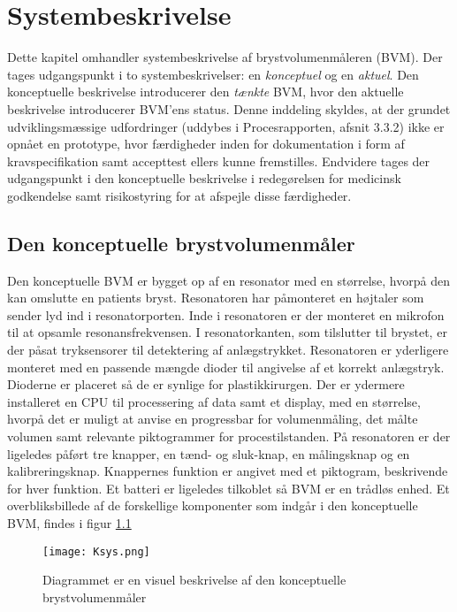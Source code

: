 \chapter{Systembeskrivelse}
Dette kapitel omhandler systembeskrivelse af brystvolumenmåleren (BVM). Der tages udgangspunkt i to systembeskrivelser: en \textit{konceptuel} og en \textit{aktuel}. Den konceptuelle beskrivelse introducerer den \textit{tænkte} BVM, hvor den aktuelle beskrivelse introducerer BVM'ens status. Denne inddeling skyldes, at der grundet udviklingsmæssige udfordringer (uddybes i Procesrapporten, afsnit 3.3.2) ikke er opnået en prototype, hvor færdigheder inden for dokumentation i form af kravspecifikation samt accepttest ellers kunne fremstilles. Endvidere tages der udgangspunkt i den konceptuelle beskrivelse i redegørelsen for medicinsk godkendelse samt risikostyring for at afspejle disse færdigheder.   

\section{Den konceptuelle brystvolumenmåler} \label{sec:BVMopb}
	
	Den konceptuelle BVM er bygget op af en resonator med en størrelse, hvorpå den kan omslutte en patients bryst. Resonatoren har påmonteret en højtaler som sender lyd ind i resonatorporten. Inde i resonatoren er der monteret en mikrofon til at opsamle resonansfrekvensen. I resonatorkanten, som tilslutter til brystet, er der påsat tryksensorer til detektering af anlægstrykket. Resonatoren er yderligere monteret med en passende mængde dioder til angivelse af et korrekt anlægstryk. Dioderne er placeret så de er synlige for plastikkirurgen. Der er ydermere installeret en CPU til processering af data samt et display, med en størrelse, hvorpå det er muligt at anvise en progressbar for volumenmåling, det målte volumen samt relevante piktogrammer for procestilstanden. På resonatoren er der ligeledes påført tre knapper, en tænd- og sluk-knap, en målingsknap og en kalibreringsknap. Knappernes funktion er angivet med et piktogram, beskrivende for hver funktion. Et batteri er ligeledes tilkoblet så BVM er en trådløs enhed. Et overbliksbillede af de forskellige komponenter som indgår i den konceptuelle BVM, findes i figur \ref{fig:ksys} 
		
\vspace{5mm}  
		
		\begin{figure}[htb]
			\centering
				\texttt{[image: Ksys.png]}
				\caption{Diagrammet er en visuel beskrivelse af den konceptuelle brystvolumenmåler}	
				\label{fig:ksys}
			\end{figure}	     
		
